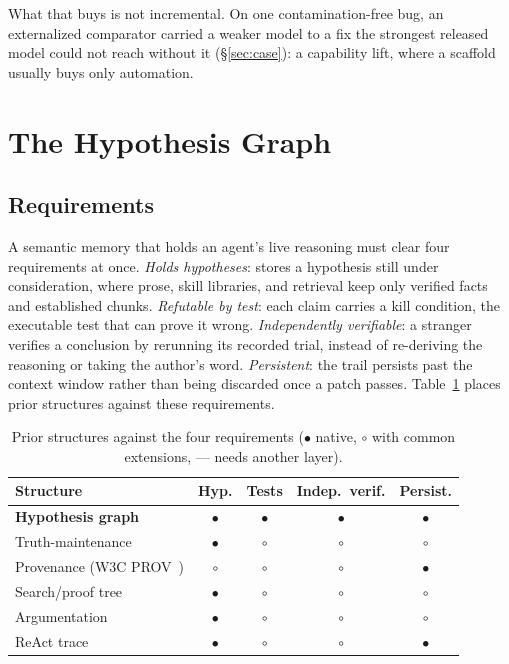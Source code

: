\documentclass[sigconf,review,anonymous]{acmart}
\begin{document}
What that buys is not incremental. On one contamination-free bug, an externalized comparator carried a weaker model to a fix the strongest released model could not reach without it (\S\ref{sec:case}): a capability lift, where a scaffold usually buys only automation.

\section{The Hypothesis Graph}\label{sec:graph}

\subsection{Requirements}

A semantic memory that holds an agent's live reasoning must clear four requirements at once. \emph{Holds hypotheses}: stores a hypothesis still under consideration, where prose, skill libraries, and retrieval keep only verified facts and established chunks. \emph{Refutable by test}: each claim carries a kill condition, the executable test that can prove it wrong. \emph{Independently verifiable}: a stranger verifies a conclusion by rerunning its recorded trial, instead of re-deriving the reasoning or taking the author's word. \emph{Persistent}: the trail persists past the context window rather than being discarded once a patch passes. Table~\ref{tab:structures} places prior structures against these requirements.

\begin{table}
\caption{Prior structures against the four requirements ($\bullet$ native, $\circ$ with common extensions, --- needs another layer).}
\label{tab:structures}
\small
\begin{tabular}{lcccc}
\toprule
Structure & Hyp. & Tests & Indep.\ verif. & Persist. \\
\midrule
\textbf{Hypothesis graph} & $\bullet$ & $\bullet$ & $\bullet$ & $\bullet$ \\
Truth-maintenance~\cite{doyle1979,dekleer1986} & $\bullet$ & $\circ$ & $\circ$ & $\circ$ \\
Provenance (W3C PROV~\cite{prov}) & $\circ$ & $\circ$ & $\circ$ & $\bullet$ \\
Search/proof tree~\cite{cegar,cegis} & $\bullet$ & $\circ$ & $\circ$ & $\circ$ \\
Argumentation~\cite{dung1995} & $\bullet$ & $\circ$ & $\circ$ & $\circ$ \\
ReAct trace~\cite{react} & $\bullet$ & $\circ$ & $\circ$ & $\bullet$ \\
\bottomrule
\end{tabular}
\end{table}
\end{document}
